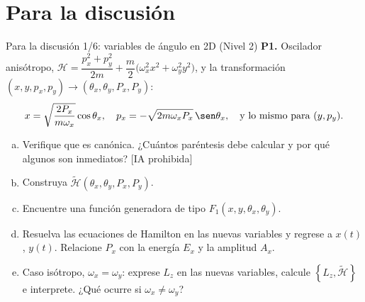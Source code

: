 \documentclass[spanish]{beamer}
\newcommand{\Ham}{\mathcal{H}}               %
\newcommand{\tH}{\tilde{\mathcal{H}}}        %
\newcommand{\pb}[2]{\left\{#1,#2\right\}}    %
\begin{document}
\section{Para la discusión}

\begin{frame}{Para la discusión 1/6: variables de ángulo en 2D (Nivel 2)}
\small
\textbf{P1.} Oscilador anisótropo,
$\Ham=\dfrac{p_x^2+p_y^2}{2m}+\dfrac m2\big(\omega_x^2x^2+\omega_y^2y^2\big)$, y la
transformación $(x,y,p_x,p_y)\to(\theta_x,\theta_y,P_x,P_y)$:
\[
  x=\sqrt{\frac{2P_x}{m\omega_x}}\cos\theta_x,\quad p_x=-\sqrt{2m\omega_xP_x}\,\sen\theta_x,
  \quad\text{y lo mismo para }(y,p_y).
\]
\begin{enumerate}[(a)]
  \item Verifique que es canónica. ¿Cuántos paréntesis debe calcular y por qué algunos
        son inmediatos? \hfill{\scriptsize[IA prohibida]}
  \item Construya $\tH(\theta_x,\theta_y,P_x,P_y)$.
  \item Encuentre una función generadora de tipo $F_1(x,y,\theta_x,\theta_y)$.
  \item Resuelva las ecuaciones de Hamilton en las nuevas variables y regrese a $x(t)$,
        $y(t)$. Relacione $P_x$ con la energía $E_x$ y la amplitud $A_x$.
  \item Caso isótropo, $\omega_x=\omega_y$: exprese $L_z$ en las nuevas variables,
        calcule $\pb{L_z}{\tH}$ e interprete. ¿Qué ocurre si $\omega_x\neq\omega_y$?
\end{enumerate}
\end{frame}
\end{document}
